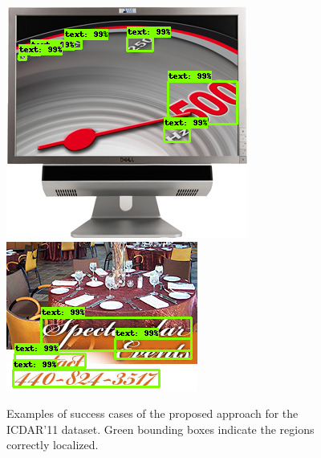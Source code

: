 \begin{figure}[!h]
    \includegraphics[height=0.20\textheight]{VISAPP/figs/qualitative-results/icdar11/14.png}
    \includegraphics[height=0.20\textheight]{VISAPP/figs/qualitative-results/icdar11/29.png}
    
    \caption{Examples of success cases of the proposed approach for the ICDAR'11 dataset. Green bounding boxes indicate the regions correctly localized.}
	\label{fig:qualitative-results-good-11}
\end{figure}


